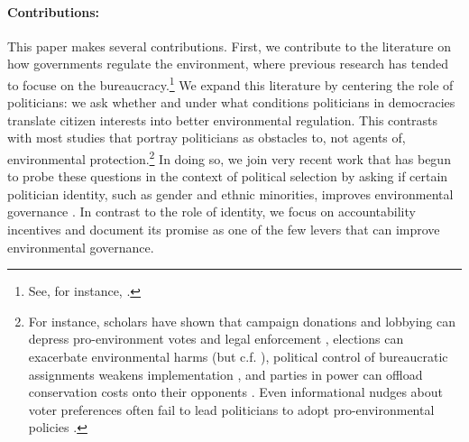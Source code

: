 \documentclass[12pt]{article}
\begin{document}

\paragraph{Contributions:}

This paper makes several contributions. First, we contribute to the literature on how governments regulate the environment, where previous research has tended to focuse on the bureaucracy.\footnote{See, for instance, \citet{burgess2012political, lipscomb2016decentralization, shen2022political, dipoppa2024bureaucrat}.} We expand this literature by centering the role of politicians: we ask whether and under what conditions politicians in democracies translate citizen interests into better environmental regulation. This contrasts with most studies that portray politicians as obstacles to, not agents of, environmental protection.\footnote{For instance, scholars have shown that campaign donations and lobbying can depress pro-environment votes and legal enforcement \citep{mcalexander2020elections, stokes2020short, harding2024buying, gonzalez2024money}, elections can exacerbate environmental harms \citep{cao2019environmental, balboni2021cycles, sanford2023democratization} (but c.f. \citet{list2006elections}), political control of bureaucratic assignments weakens implementation \citep{xu2025bureaucratic}, and parties in power can offload conservation costs onto their opponents \citep{mangonnet2022playing}. Even informational nudges about voter preferences often fail to lead politicians to adopt pro-environmental policies \citep{hsiao2025climate}.} In doing so, we join very recent work that has begun to probe these questions in the context of political selection by asking if certain politician identity, such as gender and ethnic minorities, improves environmental governance \citep{mavisakalyan2019gender, baragwanath2024greener, gagliarducci2019hurricanes,bragancca2022cutting, gulzar2024representation, jagnani2021women}. In contrast to the role of identity, we focus on accountability incentives and document its promise as one of the few levers that can improve environmental governance.
\end{document}
